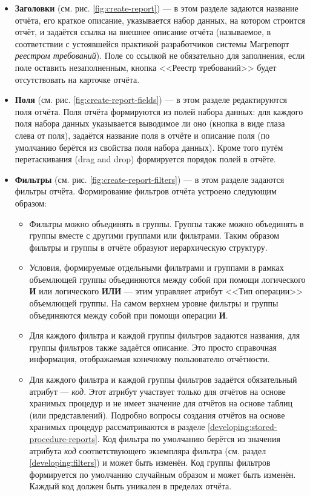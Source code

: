 \documentclass[../user-manual.tex]{subfiles}
\begin{document}
	\begin{itemize}
		\item \textbf{Заголовки} (см. рис. \ref{fig:create-report}) --- в этом разделе задаются название отчёта, его краткое описание, указывается набор данных, на котором строится отчёт, и задаётся ссылка на внешнее описание отчёта (называемое, в соответствии с устоявшейся практикой разработчиков системы Магрепорт \textit{реестром требований}). Поле со ссылкой не обязательно для заполнения, если поле оставить незаполненным, кнопка <<Реестр требований>> будет отсутствовать на карточке отчёта.
		
		\item \textbf{Поля} (см. рис. \ref{fig:create-report-fields}) --- в этом разделе редактируются поля отчёта. Поля отчёта формируются из полей набора данных: для каждого поля набора данных указывается выводимое ли оно (кнопка в виде глаза слева от поля), задаётся название поля в отчёте и описание поля (по умолчанию берётся из свойства поля набора данных). Кроме того путём перетаскивания (drag and drop) формируется порядок полей в отчёте.
		
		\item \textbf{Фильтры} (см. рис. \ref{fig:create-report-filters}) --- в этом разделе задаются фильтры отчёта. Формирование фильтров отчёта устроено следующим образом:
			\begin{itemize}
				\item Фильтры можно объединять в группы. Группы также можно объединять в группы вместе с другими группами или фильтрами. Таким образом фильтры и группы в отчёте образуют иерархическую структуру.
				
				\item Условия, формируемые отдельными фильтрами и группами в рамках объемлющей группы объединяются между собой при помощи логического \textbf{И} или логического \textbf{ИЛИ} --- этим управляет атрибут <<Тип операции>> объемлющей группы. На самом верхнем уровне фильтры и группы объединяются между собой при помощи операции \textbf{И}.
				
				\item Для каждого фильтра и каждой группы фильтров задаются названия, для группы фильтров также задаётся описание. Это просто справочная информация, отображаемая конечному пользователю отчётности.
				
				\item Для каждого фильтра и каждой группы фильтров задаётся обязательный атрибут --- \textit{код}. Этот атрибут участвует только для отчётов на основе хранимых процедур и не имеет значение для отчётов на основе таблиц (или представлений). Подробно вопросы создания отчётов на основе хранимых процедур рассматриваются в разделе \ref{developing:stored-procedure-reports}. Код фильтра по умолчанию берётся из значения атрибута \textit{код} соответствующего экземпляра фильтра (см. раздел \ref{developing:filters}) и может быть изменён. Код группы фильтров формируется по умолчанию случайным образом и может быть изменён. Каждый код должен быть уникален в пределах отчёта.
				

\end{itemize}
\end{itemize}
\end{document}
